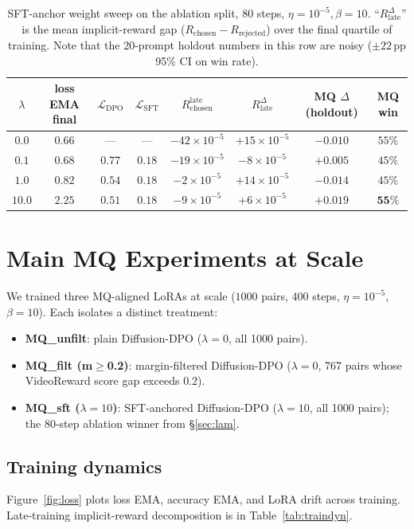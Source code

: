 \documentclass{article}
\begin{document}
\begin{table}[h]
\centering
\caption{SFT-anchor weight sweep on the ablation split, $80$ steps, $\eta{=}10^{-5}, \beta{=}10$.  ``$R^{\Delta}_{\text{late}}$'' is the mean implicit-reward gap ($R_{\text{chosen}} - R_{\text{rejected}}$) over the final quartile of training.  Note that the 20-prompt holdout numbers in this row are noisy ($\pm 22$\,pp 95\% CI on win rate).}
\label{tab:lamsweep}
\begin{tabular}{@{}c|ccccc|cc@{}}
\toprule
$\lambda$ & loss EMA final & $\mathcal{L}_{\text{DPO}}$ & $\mathcal{L}_{\text{SFT}}$ & $R_{\text{chosen}}^{\text{late}}$ & $R^{\Delta}_{\text{late}}$ & MQ $\Delta$ (holdout) & MQ win \\
\midrule
$0.0$  & $0.66$ & ---    & ---    & $-42{\times}10^{-5}$ & $+15{\times}10^{-5}$ & $-0.010$ & $55\%$ \\
$0.1$  & $0.68$ & $0.77$ & $0.18$ & $-19{\times}10^{-5}$ & $-8{\times}10^{-5}$  & $+0.005$ & $45\%$ \\
$1.0$  & $0.82$ & $0.54$ & $0.18$ & $-2{\times}10^{-5}$  & $+14{\times}10^{-5}$ & $-0.014$ & $45\%$ \\
$10.0$ & $2.25$ & $0.51$ & $0.18$ & $-9{\times}10^{-5}$  & $+6{\times}10^{-5}$  & \textbf{$+0.019$} & $\mathbf{55\%}$ \\
\bottomrule
\end{tabular}
\end{table}

\section{Main MQ Experiments at Scale}
\label{sec:main}

We trained three MQ-aligned LoRAs at scale ($1000$ pairs, $400$ steps, $\eta{=}10^{-5}$, $\beta{=}10$).  Each isolates a distinct treatment:
\begin{itemize}
\item \textbf{MQ\_unfilt}: plain Diffusion-DPO ($\lambda{=}0$, all 1000 pairs).
\item \textbf{MQ\_filt (m$\geq$0.2)}: margin-filtered Diffusion-DPO ($\lambda{=}0$, 767 pairs whose VideoReward score gap exceeds $0.2$).
\item \textbf{MQ\_sft ($\lambda{=}10$)}: SFT-anchored Diffusion-DPO ($\lambda{=}10$, all 1000 pairs); the 80-step ablation winner from \S\ref{sec:lam}.
\end{itemize}

\subsection{Training dynamics}
Figure~\ref{fig:loss} plots loss EMA, accuracy EMA, and LoRA drift across training.  Late-training implicit-reward decomposition is in Table~\ref{tab:traindyn}.
\end{document}
